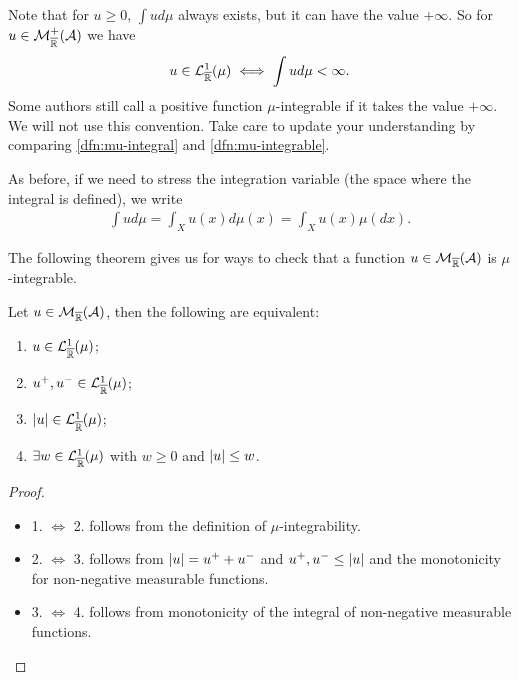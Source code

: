 \begin{remark}
	Note that for $u \geq 0$, $\int u d\mu$ always exists, but it can have the value $+\infty$. So for $u \in \mathcal{M}_{\overline{\mathbb{R}}}^+(\mathcal{A})$ we have
	\begin{align*}
		u \in \mathcal{L}_{\overline{\mathbb{R}}}^1(\mu) \iff \int u d\mu < \infty.
	\end{align*}
	Some authors still call a positive function $\mu$-integrable if it takes the value $+\infty$. We will not use this convention. Take care to update your understanding by comparing \autoref{dfn:mu-integral} and \autoref{dfn:mu-integrable}.
\end{remark}

As before, if we need to stress the integration variable (the space where the integral is defined), we write
\begin{align*}
	\int u d\mu = \int_X u(x)d\mu(x) = \int_X u(x) \mu(dx).
\end{align*}

The following theorem gives us for ways to check that a function $u \in \mathcal{M}_{\overline{\mathbb{R}}}(\mathcal{A})$ is $\mu$-integrable.

\begin{thm}
	\label{thm:characterisation-mu-integral}
	Let $u \in \mathcal{M}_{\overline{\mathbb{R}}}(\mathcal{A})$, then the following are equivalent:
	
	\begin{enumerate}
		\item $u \in \mathcal{L}^1_{\overline{\mathbb{R}}}(\mu)$;
		\item $u^+, u^- \in \mathcal{L}_{\overline{\mathbb{R}}}^1(\mu)$;
		\item $\left\vert{u}\right\vert \in \mathcal{L}_{\overline{\mathbb{R}}}^1(\mu)$;
		\item $\exists w \in \mathcal{L}_{\overline{\mathbb{R}}}^1(\mu)$ with $w \geq 0$ and $\left\vert{u}\right\vert \leq w$.
	\end{enumerate}
\end{thm}

\begin{proof}$ $
	\begin{itemize}
		\item 1. $\iff$ 2. follows from the definition of $\mu$-integrability.
		\item 2. $\iff$ 3. follows from $\left\vert{u}\right\vert = u^+ + u^-$ and $u^+, u^- \leq \left\vert{u}\right\vert$ and the monotonicity for non-negative measurable functions.
		\item 3. $\iff$ 4. follows from monotonicity of the integral of non-negative measurable functions.
	\end{itemize}
\end{proof}

